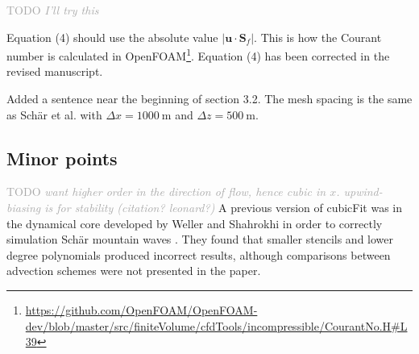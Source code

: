 \documentclass[times]{elsarticle}
\newcommand{\TODO}[1]{\textcolor{darkgray}{TODO \textit{#1}}}
\begin{document}
\begin{quotation}
\begin{comment}
\item Might it be possible to include the time discretization (2) in the stability analysis?
It would be interesting to know if the weak instability of (2) (noted on p3) affects
the constraints (57), (58), (63).
\end{comment}
\end{quotation}
\TODO{I'll try this}

\begin{quotation}
\begin{comment}
\item The Courant number as defined by (4) would appear to vanish for a non-divergent
flow. A more natural definition might be to sum only over outflow faces (and
remove the factor $1/2$). For non-divergent flow that would be equivalent to
replacing $\mathbf{u} \cdot \mathbf{S}_f$ by $| \mathbf{u} \cdot \mathbf{S}_f |$
in~(4).
\end{comment}
\end{quotation}
Equation (4) should use the absolute value $\lvert \mathbf{u} \cdot \mathbf{S}_f \rvert$.  This is how the Courant number is calculated in OpenFOAM\footnote{\url{https://github.com/OpenFOAM/OpenFOAM-dev/blob/master/src/finiteVolume/cfdTools/incompressible/CourantNo.H\#L39}}.  Equation (4) has been corrected in the revised manuscript.

\begin{quotation}
\begin{comment}
\item Section 3.2 and Table~1: what resolution is used?
\end{comment}
\end{quotation}
Added a sentence near the beginning of section 3.2.  The mesh spacing is the same as Sch\"ar et al. \citep{schaer2002} with $\Delta x = \SI{1000}{\meter}$ and $\Delta z = \SI{500}{\meter}$.

\subsection*{Minor points}

\begin{quotation}
\begin{comment}
\item It would be interesting to know if there was some rationale for the choice of
the polynomial (5) and the stencil discussed in  section 2.1.1. Given that the scheme
is second order convergent, might it be possible to use a lower degree polynomial
and smaller stencil?
\end{comment}
\end{quotation}
\TODO{want higher order in the direction of flow, hence cubic in $x$.  upwind-biasing is for stability (citation? leonard?)}
A previous version of cubicFit was in the dynamical core developed by Weller and Shahrokhi \citep{weller-shahrokhi2014} in order to correctly simulation Sch\"ar mountain waves \citep{schaer2002}.  They found that smaller stencils and lower degree polynomials produced incorrect results, although comparisons between advection schemes were not presented in the paper.
\end{document}
